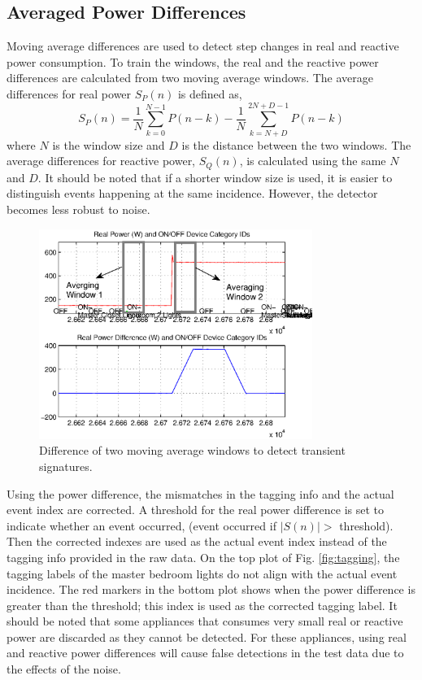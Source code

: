 \documentclass[conference]{IEEEtran}
\begin{document}
\subsection{Averaged Power Differences}
Moving average differences are used to detect step changes in real and reactive power consumption. To train the windows, the real and the reactive power differences are calculated from two moving average windows.  The average differences for real power $S_{P}(n)$ is defined as,
\begin{equation}
S_{P}(n) = \frac{1}{N}\sum_{k=0}^{N-1}P(n-k) - \frac{1}{N}\sum_{k=N+D}^{2N+D-1}P(n-k)
\end{equation}
where $N$ is the window size and $D$ is the distance between the two windows.  The average differences for reactive power, $S_{Q}(n)$, is calculated using the same $N$ and $D$.  It should be noted that if a shorter window size is used, it is easier to distinguish events happening at the same incidence.  However, the detector becomes less robust to noise.

\begin{figure}[!t]
	\centering
	\includegraphics[width=3.5in]{fig/maw.eps}
	\caption{Difference of two moving average windows to detect transient signatures.}
	\label{fig:maw}
\end{figure}

Using the power difference,  the mismatches in the tagging info and the actual event index are corrected.  A threshold for the real power difference is set to indicate whether an event occurred, (event occurred if $|S(n)| >$ threshold).  Then the corrected indexes are used as the actual event index instead of the tagging info provided in the raw data.  On the top plot of Fig. \ref{fig:tagging}, the tagging labels of the master bedroom lights do not align with the actual event incidence.  The red markers in the bottom plot shows when the power difference is greater than the threshold; this index is used as the corrected tagging label.  It should be noted that some appliances that consumes very small real or reactive power are discarded as they cannot be detected.  For these appliances, using real and reactive power differences will cause false detections in the test data due to the effects of the noise. 
\end{document}
